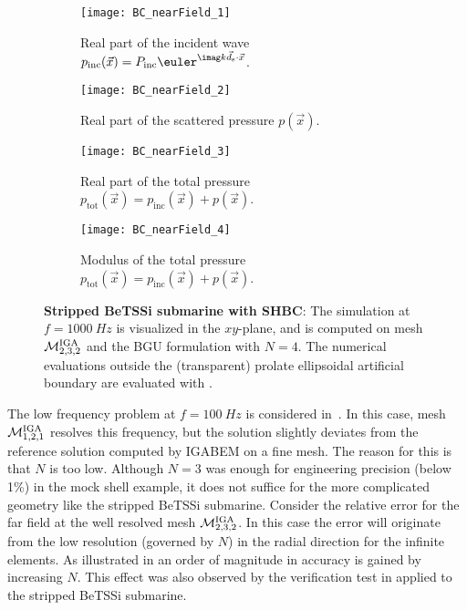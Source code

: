 \begin{figure}
	\centering    
	\begin{subfigure}[b]{\textwidth}
		\centering
		\texttt{[image: BC\_nearField\_1]}
		\caption{Real part of the incident wave $p_{\mathrm{inc}}(\vec{x})=P_{\mathrm{inc}}\euler^{\imag k\vec{d}_{\mathrm{s}}\cdot \vec{x}}$.}
	\end{subfigure}
	\par\bigskip
	\begin{subfigure}[b]{\textwidth}
		\centering
		\texttt{[image: BC\_nearField\_2]}
		\caption{Real part of the scattered pressure $p(\vec{x})$.}
	\end{subfigure}
	\par\bigskip
	\begin{subfigure}[b]{\textwidth}
		\centering
		\texttt{[image: BC\_nearField\_3]}
		\caption{Real part of the total pressure $p_{\mathrm{tot}}(\vec{x})=p_{\mathrm{inc}}(\vec{x})+p(\vec{x})$.}
	\end{subfigure}
	\par\bigskip
	\begin{subfigure}[b]{\textwidth}
		\centering
		\texttt{[image: BC\_nearField\_4]}
		\caption{Modulus of the total pressure $p_{\mathrm{tot}}(\vec{x})=p_{\mathrm{inc}}(\vec{x})+p(\vec{x})$.}
	\end{subfigure}
	\caption{\textbf{Stripped BeTSSi submarine with SHBC}: The simulation at $f=\SI{1000}{Hz}$ is visualized in the $xy$-plane, and is computed on mesh ${\cal M}_{2,3,2}^{\mathrm{IGA}}$ and the BGU formulation with $N=4$. The numerical evaluations outside the (transparent) prolate ellipsoidal artificial boundary are evaluated with .}
	\label{Fig2:BC_NearField}
\end{figure}
The low frequency problem at $f = \SI{100}{Hz}$ is considered in~. In this case, mesh ${\cal M}_{1,2,1}^{\mathrm{IGA}}$ resolves this frequency, but the solution slightly deviates from the reference solution computed by IGABEM on a fine mesh. The reason for this is that $N$ is too low. Although $N=3$ was enough for engineering precision (below 1\%) in the mock shell example, it does not suffice for the more complicated geometry like the stripped BeTSSi submarine. Consider the relative error for the far field at the well resolved mesh ${\cal M}_{2,3,2}^{\mathrm{IGA}}$. In this case the error will originate from the low resolution (governed by $N$) in the radial direction for the infinite elements. As illustrated in  an order of magnitude in accuracy is gained by increasing $N$. This effect was also observed by the verification test in  applied to the stripped BeTSSi submarine.
